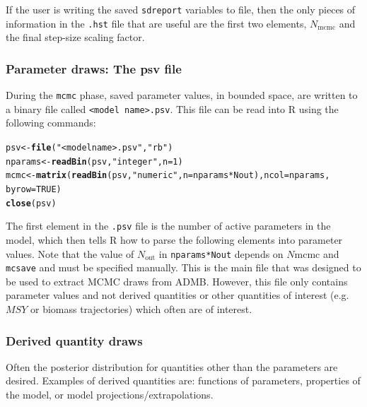 \documentclass{article}\usepackage[]{graphicx}\usepackage[]{color}
\makeatletter
\newcommand{\hlnum}[1]{\textcolor[rgb]{0.686,0.059,0.569}{#1}}%
\newcommand{\hlstr}[1]{\textcolor[rgb]{0.192,0.494,0.8}{#1}}%
\newcommand{\hlopt}[1]{\textcolor[rgb]{0,0,0}{#1}}%
\newcommand{\hlstd}[1]{\textcolor[rgb]{0.345,0.345,0.345}{#1}}%
\newcommand{\hlkwb}[1]{\textcolor[rgb]{0.69,0.353,0.396}{#1}}%
\newcommand{\hlkwc}[1]{\textcolor[rgb]{0.333,0.667,0.333}{#1}}%
\newcommand{\hlkwd}[1]{\textcolor[rgb]{0.737,0.353,0.396}{\textbf{#1}}}%
\newenvironment{kframe}{%
 \def\at@end@of@kframe{}%
 \ifinner\ifhmode%
  \def\at@end@of@kframe{\end{minipage}}%
  \begin{minipage}{\columnwidth}%
 \fi\fi%
 \def\FrameCommand##1{\hskip\@totalleftmargin \hskip-\fboxsep
 \colorbox{shadecolor}{##1}\hskip-\fboxsep
     \hskip-\linewidth \hskip-\@totalleftmargin \hskip\columnwidth}%
 \MakeFramed {\advance\hsize-\width
   \@totalleftmargin\z@ \linewidth\hsize
   \@setminipage}}%
 {\par\unskip\endMakeFramed%
 \at@end@of@kframe}
\newenvironment{knitrout}{}{} %
\makeatother
\begin{document}
If the user is writing the saved \texttt{sdreport} variables to file, then the only
pieces of information in the \texttt{.hst} file that are useful are the first two
elements, $N_\text{mcmc}$ and the final step-size scaling factor.

\subsubsection{Parameter draws: The psv file}
During the \texttt{mcmc} phase, saved parameter values, in
bounded space, are written to a binary file called
\texttt{<model name>.psv}. This file can be read into R
using the following commands:
\begin{knitrout}
\color{fgcolor}\begin{kframe}
\begin{alltt}
\hlstd{psv} \hlkwb{<-} \hlkwd{file}\hlstd{(}\hlstr{"<model name>.psv"}\hlstd{,} \hlstr{"rb"}\hlstd{)}
\hlstd{nparams} \hlkwb{<-} \hlkwd{readBin}\hlstd{(psv,} \hlstr{"integer"}\hlstd{,} \hlkwc{n} \hlstd{=} \hlnum{1}\hlstd{)}
\hlstd{mcmc} \hlkwb{<-} \hlkwd{matrix}\hlstd{(}\hlkwd{readBin}\hlstd{(psv,} \hlstr{"numeric"}\hlstd{,} \hlkwc{n} \hlstd{= nparams} \hlopt{*} \hlstd{Nout),} \hlkwc{ncol} \hlstd{= nparams,}
    \hlkwc{byrow} \hlstd{=} \hlnum{TRUE}\hlstd{)}
\hlkwd{close}\hlstd{(psv)}
\end{alltt}
\end{kframe}
\end{knitrout}

The first element in the \texttt{.psv} file is the number of
active parameters in the model, which then tells R how to
parse the following elements into parameter values. Note
that the value of $N_\text{out}$ in \texttt{nparams*Nout} depends on
$N\text{mcmc}$ and \texttt{mcsave} and must be specified
manually. This is the main file that was designed to be used
to extract MCMC draws from ADMB. However, this file only
contains parameter values and not derived quantities or
other quantities of interest (e.g.\ $MSY$ or biomass
trajectories) which often are of interest.
\subsubsection{Derived quantity draws}\label{sec:derived.quantities}
Often the posterior distribution for quantities other than
the parameters are desired. Examples of derived quantities
are: functions of parameters, properties of the model, or
model projections/extrapolations.
\end{document}
